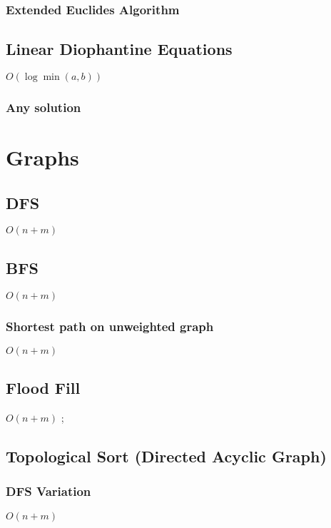 \documentclass{article}
\begin{document}
\subsubsection{Extended Euclides Algorithm}


\subsection{Linear Diophantine Equations}
$O(\log \min (a, b))$
\subsubsection{Any solution}



\section{Graphs}
\subsection{DFS}
$O(n+m)$


\subsection{BFS}
$O(n+m)$


\subsubsection{Shortest path on unweighted graph}
$O(n+m)$


\subsection{Flood Fill}
$O(n+m)$
;

\subsection{Topological Sort (Directed Acyclic Graph)}
\subsubsection{DFS Variation}
$O(n+m)$

\end{document}
